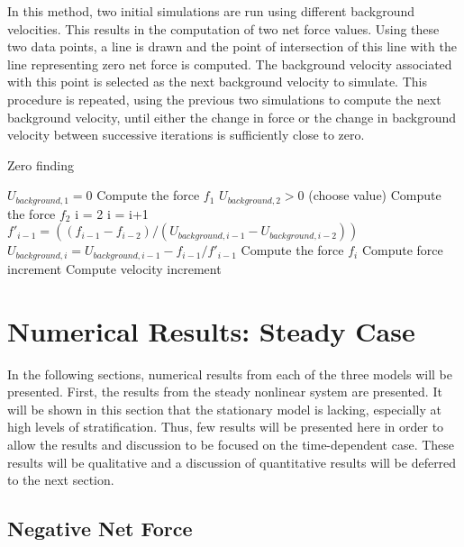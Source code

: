 \documentclass[12pt]{article}
\begin{document}
In this method, two initial simulations are run using different background velocities. This results in the computation of two net force values. Using these two data points, a line is drawn and the point of intersection of this line with the line representing zero net force is computed. The background velocity associated with this point is selected as the next background velocity to simulate. This procedure is repeated, using the previous two simulations to compute the next background velocity, until either the change in force or the change in background velocity between successive iterations is sufficiently close to zero.
\begin{algorithm}[H]
	\caption{Zero finding}\label{zerofind}
	\begin{algorithmic}[1]
		
		\State $U_{background,1}=0$
		\State Compute the force $f_1$
		\State $U_{background,2}>0$ (choose value)
		\State Compute the force $f_2$
		\State i = 2
		\State i = i+1
		\State $f'_{i-1} = ((f_{i-1}-f_{i-2})/(U_{background,i-1}-U_{background,i-2}))$
		\State $U_{background,i} = U_{background,i-1} - f_{i-1}/f'_{i-1}$
		\State Compute the force $f_i$
		\State Compute force increment
		\State Compute velocity increment
		\EndWhile
		
	\end{algorithmic}
\end{algorithm}

\newpage

\section{Numerical Results: Steady Case}

In the following sections, numerical results from each of the three models will be presented. First, the results from the steady nonlinear system are presented. It will be shown in this section that the stationary model is lacking, especially at high levels of stratification. Thus, few results will be presented here in order to allow the results and discussion to be focused on the time-dependent case. These results will be qualitative and a discussion of quantitative results will be deferred to the next section.

\subsection{Negative Net Force}
\end{document}
